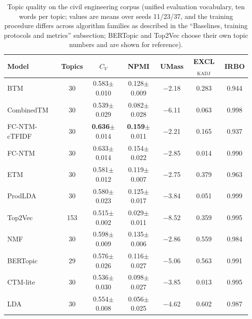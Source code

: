 \documentclass[Journal,letterpaper,NoLists]{ascelike-new}
\newcommand{\fcntm}{FC-NTM}
\begin{document}
 \begin{table}[t]
\centering
\caption{Topic quality on the civil engineering corpus (unified evaluation vocabulary, ten words per topic; values are means over seeds 11/23/37, and the training procedure differs across algorithm families as described in the ``Baselines, training protocols and metrics'' subsection; BERTopic and Top2Vec choose their own topic numbers and are shown for reference).}
\label{tab:civil}
\small
\begin{tabular}{lcccccc}
\toprule
Model & Topics & $C_V$ & NPMI & UMass & EXCL$_{\mathrm{KADJ}}$ & IRBO \\
\midrule
BTM & 30 & 0.583$\pm$0.010 & 0.128$\pm$0.009 & $-$2.18 & 0.283 & 0.944 \\
CombinedTM & 30 & 0.539$\pm$0.029 & 0.082$\pm$0.028 & $-$6.11 & 0.063 & 0.998 \\
\fcntm{}-cTFIDF & 30 & \textbf{0.636}$\pm$0.014 & \textbf{0.159}$\pm$0.011 & $-$2.21 & 0.165 & 0.937 \\
\fcntm{} & 30 & 0.633$\pm$0.014 & 0.154$\pm$0.022 & $-$2.85 & 0.014 & 0.990 \\
ETM & 30 & 0.581$\pm$0.012 & 0.119$\pm$0.007 & $-$2.75 & 0.379 & 0.963 \\
ProdLDA & 30 & 0.580$\pm$0.023 & 0.125$\pm$0.017 & $-$3.84 & 0.051 & 0.999 \\
Top2Vec & 153 & 0.515$\pm$0.002 & 0.029$\pm$0.011 & $-$8.52 & 0.359 & 0.995 \\
NMF & 30 & 0.598$\pm$0.009 & 0.135$\pm$0.006 & $-$2.86 & 0.559 & 0.984 \\
BERTopic & 29 & 0.576$\pm$0.026 & 0.116$\pm$0.027 & $-$5.06 & 0.563 & 0.991 \\
CTM-lite & 30 & 0.536$\pm$0.030 & 0.098$\pm$0.027 & $-$3.85 & 0.013 & 0.995 \\
LDA & 30 & 0.554$\pm$0.008 & 0.056$\pm$0.025 & $-$4.62 & 0.602 & 0.987 \\
\bottomrule
\end{tabular}
\end{table}
\end{document}
